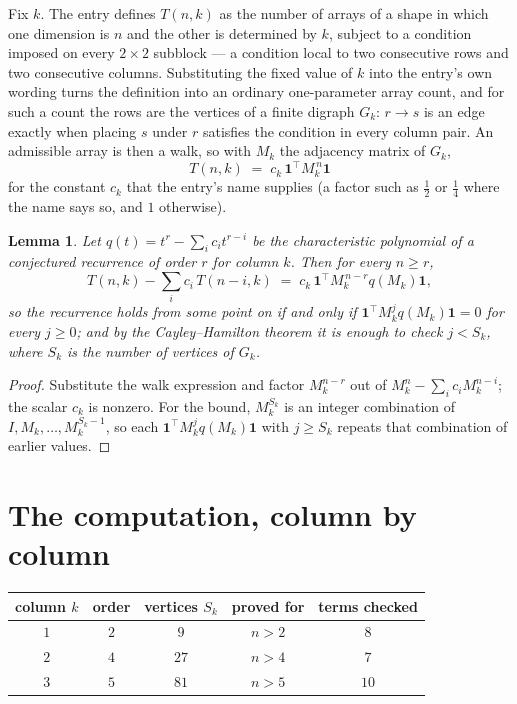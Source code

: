 \documentclass[11pt,a4paper]{article}
\theoremstyle{plain}
\newtheorem{lemma}[theorem]{Lemma}
\theoremstyle{definition}
\begin{document}
Fix $k$. The entry defines $T(n,k)$ as the number of arrays of a shape in which one dimension
is $n$ and the other is determined by $k$, subject to a condition imposed on every
$2\times2$ subblock --- a condition local to two consecutive rows and two consecutive columns.
Substituting the fixed value of $k$ into the entry's own wording turns the definition into an
ordinary one-parameter array count, and for such a count the rows are the vertices of a finite
digraph $G_k$: $r\to s$ is an edge exactly when placing $s$ under $r$ satisfies the condition
in every column pair. An admissible array is then a walk, so with $M_k$ the adjacency matrix
of $G_k$,
\[
T(n,k)\;=\;c_k\,\mathbf{1}^{\!\top}M_k^{\,n}\mathbf{1}
\]
for the constant $c_k$ that the entry's name supplies (a factor such as $\tfrac12$ or
$\tfrac14$ where the name says so, and $1$ otherwise).

\begin{lemma}\label{lem:crit}
Let $q(t)=t^{r}-\sum_i c_it^{r-i}$ be the characteristic polynomial of a conjectured
recurrence of order $r$ for column $k$. Then for every $n\ge r$,
\[
T(n,k)-\sum_i c_i\,T(n-i,k)\;=\;c_k\,\mathbf{1}^{\!\top}M_k^{\,n-r}q(M_k)\mathbf{1},
\]
so the recurrence holds from some point on if and only if
$\mathbf{1}^{\!\top}M_k^{j}q(M_k)\mathbf{1}=0$ for every $j\ge0$; and by the
Cayley--Hamilton theorem it is enough to check $j<S_k$, where $S_k$ is the number of vertices
of $G_k$.
\end{lemma}

\begin{proof}
Substitute the walk expression and factor $M_k^{n-r}$ out of $M_k^{n}-\sum_ic_iM_k^{n-i}$;
the scalar $c_k$ is nonzero. For the bound, $M_k^{S_k}$ is an integer combination of
$I,M_k,\dots,M_k^{S_k-1}$, so each $\mathbf{1}^{\!\top}M_k^{j}q(M_k)\mathbf{1}$ with
$j\ge S_k$ repeats that combination of earlier values.
\end{proof}

\section{The computation, column by column}

\begin{center}
\begin{tabular}{ccccc}
column $k$ & order & vertices $S_k$ & proved for & terms checked \\ \hline
$1$ & $2$ & $9$ & $n>2$ & $8$ \\
$2$ & $4$ & $27$ & $n>4$ & $7$ \\
$3$ & $5$ & $81$ & $n>5$ & $10$ \\
\end{tabular}
\end{center}
\end{document}
